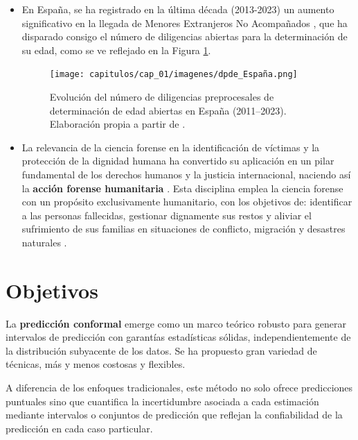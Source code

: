 \begin{itemize}
    \item En España, se ha registrado en la última década (2013-2023) un aumento significativo en la llegada
    de Menores Extranjeros No Acompañados \cite{fge2024,fge2019,fge2016,fge2013}, que ha disparado 
    consigo el número de diligencias abiertas para la determinación de su edad, como se ve reflejado 
    en la Figura \ref{fig:evolucion_DPDE}.

    \begin{figure}[h]
        \centering
        \texttt{[image: capitulos/cap\_01/imagenes/dpde\_España.png]}
        \caption{
            Evolución del número de diligencias preprocesales de determinación de edad abiertas en 
            España (2011–2023). 
            Elaboración propia a partir de \cite{fge2013,fge2016,fge2019, fge2024}.
        } 
        \label{fig:evolucion_DPDE}
    \end{figure}

    \item La relevancia de la ciencia forense en la identificación de víctimas y la protección de la dignidad 
    humana ha convertido su aplicación en un pilar fundamental de los derechos humanos y la justicia 
    internacional, naciendo así la  \textbf{acción forense humanitaria} \cite{cordner2017}. Esta disciplina 
    emplea la ciencia forense con un propósito exclusivamente humanitario, con los objetivos de: identificar 
    a las personas fallecidas, gestionar dignamente sus restos y aliviar el sufrimiento de sus familias en 
    situaciones de conflicto, migración y desastres naturales \cite{tidballbinz2021}. 

\end{itemize}


\section{Objetivos}

La \textbf{predicción conformal} emerge como un marco teórico robusto para 
generar intervalos de predicción con garantías estadísticas sólidas, independientemente de la distribución 
subyacente de los datos. Se ha propuesto gran variedad de técnicas, más y menos costosas y flexibles.

A diferencia de los enfoques tradicionales, este método no solo ofrece predicciones puntuales sino que 
cuantifica la incertidumbre asociada a cada estimación mediante intervalos o conjuntos de 
predicción que reflejan la confiabilidad de la predicción en cada caso particular.


